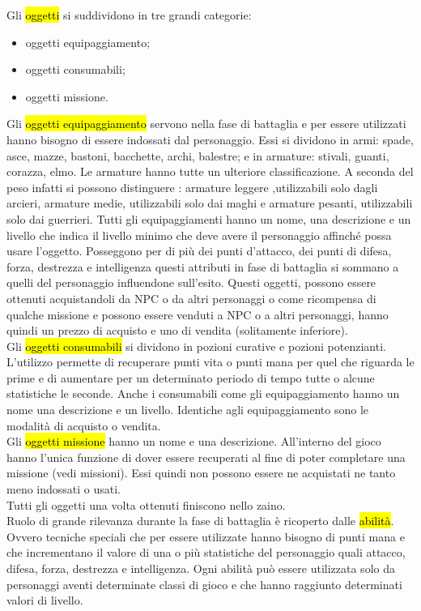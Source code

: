 Gli \hl{oggetti} si suddividono  in tre grandi categorie: 
\begin{itemize}
\item	oggetti equipaggiamento;
\item	oggetti consumabili;
\item	oggetti missione.
\end{itemize}

Gli \hl{oggetti equipaggiamento} servono nella fase di battaglia e per essere utilizzati hanno bisogno di essere indossati dal personaggio. Essi si dividono in armi: spade, asce, mazze, bastoni, bacchette, archi, balestre; e in armature: stivali, guanti, corazza, elmo. Le armature hanno tutte un ulteriore classificazione. A seconda del peso infatti si possono distinguere : armature leggere ,utilizzabili solo dagli arcieri, armature medie, utilizzabili solo dai maghi  e armature pesanti, utilizzabili solo dai guerrieri. Tutti gli equipaggiamenti hanno un nome, una descrizione  e  un livello che indica il livello minimo che deve avere il personaggio affinch\'{e} possa usare l'oggetto. Posseggono per di pi\`{u} dei punti d'attacco, dei punti di difesa, forza, destrezza e intelligenza  questi attributi in fase di battaglia si sommano a quelli del personaggio influendone sull'esito. Questi  oggetti, possono essere ottenuti acquistandoli da NPC o da altri personaggi o come ricompensa di  qualche missione e possono  essere venduti a NPC o a altri personaggi, hanno quindi un prezzo di acquisto e uno di vendita (solitamente inferiore).
\\

Gli \hl{oggetti consumabili} si dividono in pozioni curative e pozioni potenzianti. L'utilizzo permette di recuperare punti vita o punti mana per quel che riguarda le prime e di aumentare per un determinato periodo di tempo tutte o alcune statistiche le seconde. Anche i consumabili come gli equipaggiamento hanno un nome una descrizione e un livello. Identiche agli equipaggiamento sono le modalità di acquisto o vendita.\\

Gli \hl{oggetti missione} hanno un nome e una descrizione. All'interno del gioco hanno l'unica funzione di dover essere recuperati al fine di poter completare una missione (vedi missioni). Essi quindi non possono essere ne acquistati ne tanto meno indossati o usati.\\
Tutti gli oggetti una volta ottenuti finiscono nello zaino.\\

Ruolo di grande rilevanza durante la fase di battaglia è ricoperto dalle \hl{abilità}.
Ovvero tecniche speciali che per essere utilizzate hanno bisogno di punti mana e che  incrementano il valore di una o pi\`{u} statistiche del personaggio quali attacco, difesa, forza, destrezza e intelligenza. Ogni abilit\`{a} pu\`{o} essere utilizzata solo da personaggi aventi determinate classi di gioco e che hanno raggiunto determinati valori di livello.
\\
									
